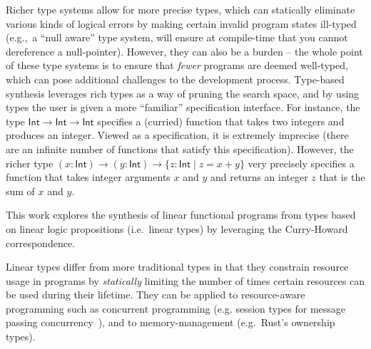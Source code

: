 \documentclass{llncs}
\newcommand{\mypara}[1]{\paragraph{\textbf{#1}.}}
\begin{document}
Richer type systems allow for more precise types, which can
statically eliminate various kinds of logical errors by making certain
invalid program states ill-typed (e.g.,~a ``null aware'' type system,
will ensure at compile-time that you cannot dereference a
null-pointer). However, they can also be a burden -- the whole point
of these type systems is to ensure that \emph{fewer} programs are
deemed well-typed, which can pose additional challenges to the
development process. Type-based synthesis leverages rich types as a
way of pruning the search space, and by using types the user 
is given a more ``familiar'' specification interface. For instance, the type
$\mathsf{Int} \rightarrow \mathsf{Int} \rightarrow \mathsf{Int}$
specifies a (curried) function that takes two integers and produces an
integer. Viewed as a specification, it is extremely imprecise (there
are an infinite number of functions that satisfy this specification).
However, the richer type $(x{:}\mathsf{Int}) \rightarrow
(y{:}\mathsf{Int}) \rightarrow \{z{:}\mathsf{Int} \mid z = x+y\}$
very precisely specifies a function that takes integer arguments $x$
and $y$ and returns an integer $z$ that is the sum of $x$ and $y$. 

%
This work explores the synthesis of linear functional
programs from types based on linear logic propositions (i.e.~linear
types) by leveraging the Curry-Howard correspondence. 


Linear types differ from more traditional types in
that they constrain resource usage in programs by \emph{statically}
limiting the number of times certain resources can be used during
their lifetime.  They can be applied to resource-aware programming
such as concurrent programming (e.g. session types for message passing
concurrency~\cite{DBLP:journals/mscs/CairesPT16}), and to memory-management (e.g.~Rust's ownership
types).

\end{document}

